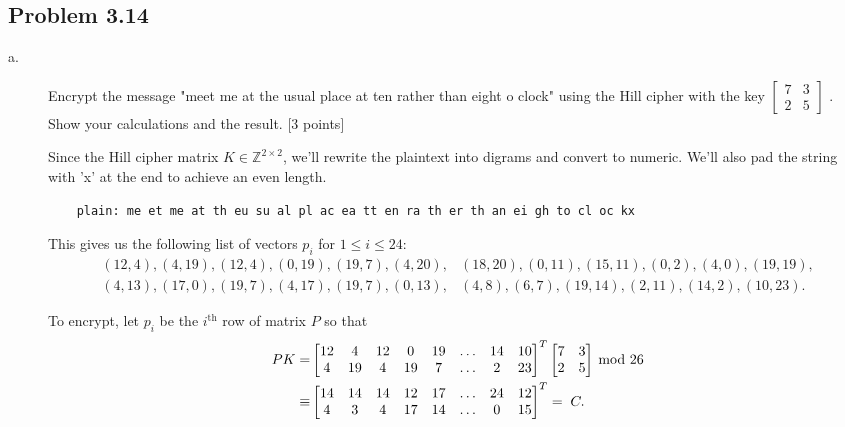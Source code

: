 \documentclass[../hw_sols.tex]{subfiles}
\begin{document}
\newpage



\subsection*{Problem 3.14}

\begin{description}

\item[a.] Encrypt the message "meet me at the usual place at ten rather than 
eight o clock" using the Hill cipher with the key 
$\begin{bmatrix} 7 & 3 \\ 2 & 5 \end{bmatrix}$
. Show your calculations and the result. [3 points]

\begin{solution}

Since the Hill cipher matrix $K \in \mathbb{Z}^{2 \times 2}$, we'll rewrite the 
plaintext into digrams and convert to numeric. We'll also pad the string with 
'x' at the end to achieve an even length.
\begin{verbatim}
    plain: me et me at th eu su al pl ac ea tt en ra th er th an ei gh to cl oc kx
\end{verbatim}

This gives us the following list of vectors $p_i$ for $1 \leq i \leq 24$:
\begin{align*}
	(12,4), (4,19), (12,4), (0,19), (19,7), (4,20),& 
		(18,20), (0,11), (15,11), (0,2), (4,0), (19,19), \\
	(4,13), (17,0), (19,7), (4,17), (19,7), (0,13),& 
		(4,8), (6,7), (19,14), (2,11), (14,2), (10,23).
\end{align*}

To encrypt, let $p_i$ be the $i^{\text{th}}$ row of matrix $P$ so that
\begin{align*}
	PK =& 
	\begin{bmatrix}
		12 & 4 & 12 & 0 & 19 & \dots & 14 & 10 \\
		4 & 19 & 4 & 19 & 7 & \dots & 2 & 23
	\end{bmatrix}^T
	\begin{bmatrix} 7 & 3 \\ 2 & 5 \end{bmatrix} 
	\tmod{26} \\
	\equiv& 
	\begin{bmatrix}
		14 & 14 & 14 & 12 & 17 & \dots & 24 & 12 \\
		4 & 3 & 4 & 17 & 14 & \dots & 0 & 15
	\end{bmatrix}^T 
	= \; C.
\end{align*}


\end{solution}
\end{description}
\end{document}
